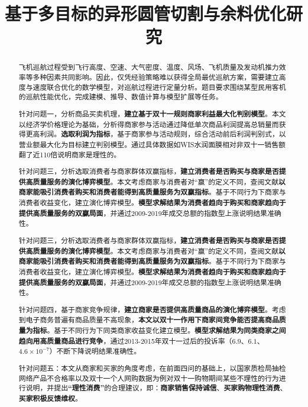 \documentclass[UTF8]{ctexart}
\title{\textbf{基于多目标的异形圆管切割与余料优化研究}}%
\date{}%
\author{}%
\providecommand{\sihao}{}
\providecommand{\xiaosihao}{}
\begin{document}
\setcounter{page}{1}%
\maketitle
\vspace{-0.95cm}
\thispagestyle{fancy}   
\fancyhf{} %
\renewcommand{\headrulewidth}{0pt} %
\renewcommand{\abstractname}{\sihao 摘\quad 要} %
\begin{abstract}\xiaosihao
	\vspace{0.1cm}
	飞机巡航过程受到飞行高度、空速、大气密度、温度、风场、飞机质量及发动机推力效率等多种因素共同影响。因此，仅凭经验策略难以获得全局最优巡航方案，需要建立高度与速度联合优化的数学模型，对巡航过程进行定量分析。题目要求围绕某型民用客机的巡航性能优化，完成建模、推导、数值计算与模型扩展等任务。\par
	针对问题一，分析商品买卖机理，\textbf{建立基于双十一规则商家利益最大化判别模型}。本文以经济学价格理论为基础，分析得商家参与活动通过降低单次商品利润提高总销量而获得更高利润。\textbf{选取利润为指标}，基于商家参与活动规则，综合活动前后利润判别式，以营业额最大化为目标建立判别模型。通过具体数据如WIS水润面膜相对非双十一销售额翻了近110倍说明商家是理性的。\par
	针对问题三，分析选取消费者与商家群体双赢指标，\textbf{建立消费者是否购买与商家是否提供高质量服务的演化博弈模型}。本文考虑商家与消费者对“赢”的定义不同，查阅文献\textbf{以商家能吸引消费者购买和消费者能得到高质量服务为双赢指标}。基于不同行为下商家与消费者收益变化，建立演化博弈模型。\textbf{模型求解结果为消费者趋向于购买和商家趋向于提供高质量服务的双赢局面}，并通过2009-2019年成交总额的指数型上涨说明结果准确性。\par
	针对问题三，分析选取消费者与商家群体双赢指标，\textbf{建立消费者是否购买与商家是否提供高质量服务的演化博弈模型}。本文考虑商家与消费者对“赢”的定义不同，查阅文献\textbf{以商家能吸引消费者购买和消费者能得到高质量服务为双赢指标}。基于不同行为下商家与消费者收益变化，建立演化博弈模型。\textbf{模型求解结果为消费者趋向于购买和商家趋向于提供高质量服务的双赢局面}，并通过2009-2019年成交总额的指数型上涨说明结果准确性。\par
	针对问题四，基于商家竞争规律，\textbf{建立商家是否提供高质量商品的演化博弈模型}。考虑到电子商务普遍有商品质量不高现象，\textbf{本文以双十一作用下商家间竞争能否提高商品质量为指标}。基于不同行为下同类商家收益变化建立模型。\textbf{模型求解结果为同类商家之间趋向用高质量商品进行竞争}，通过2013-2015年双十一过后的投诉率（$6.9$、$6.1$、$4.6\times10^{-7}$）不断下降说明结果准确性。\par
	针对问题五：本文从商家和买家的角度考虑，在前面四问的基础上，以国家质检局抽检网络产品不合格率以及双十一个人网购数据为例对双十一购物期间某些不理性的行为进行说明，并提出\textbf{“理性消费”}的合理建议，即：\textbf{商家销售保持诚信}、\textbf{买家购物理性消费}、\textbf{买家积极反馈维权}。
	\\
	

\end{abstract}
\end{document}
